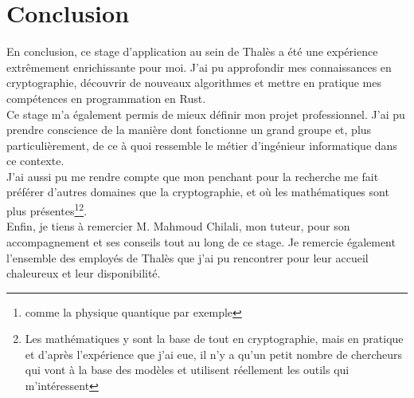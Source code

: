 \documentclass[a4paper, 12pt]{article}
\begin{document}
\section{Conclusion}
En conclusion, ce stage d'application au sein de Thalès a été une expérience extrêmement enrichissante pour moi. J'ai pu approfondir mes connaissances en cryptographie, découvrir de nouveaux algorithmes et mettre en pratique mes compétences en programmation en Rust.\\

Ce stage m'a également permis de mieux définir mon projet professionnel. J'ai pu prendre conscience de la manière dont fonctionne un grand groupe et, plus particulièrement, de ce à quoi ressemble le métier d'ingénieur informatique dans ce contexte. \\J'ai aussi pu me rendre compte que mon penchant pour la recherche me fait préférer d'autres domaines que la cryptographie, et où les mathématiques sont plus présentes\footnote{comme la physique quantique par exemple}\footnote{Les mathématiques y sont la base de tout en cryptographie, mais en pratique et d'après l'expérience que j'ai eue, il n'y a qu'un petit nombre de chercheurs qui vont à la base des modèles et utilisent réellement les outils qui m'intéressent}. \\

Enfin, je tiens à remercier M. Mahmoud Chilali, mon tuteur, pour son accompagnement et ses conseils tout au long de ce stage. Je remercie également l'ensemble des employés de Thalès que j'ai pu rencontrer pour leur accueil chaleureux et leur disponibilité.
\printbibliography
\end{document}
